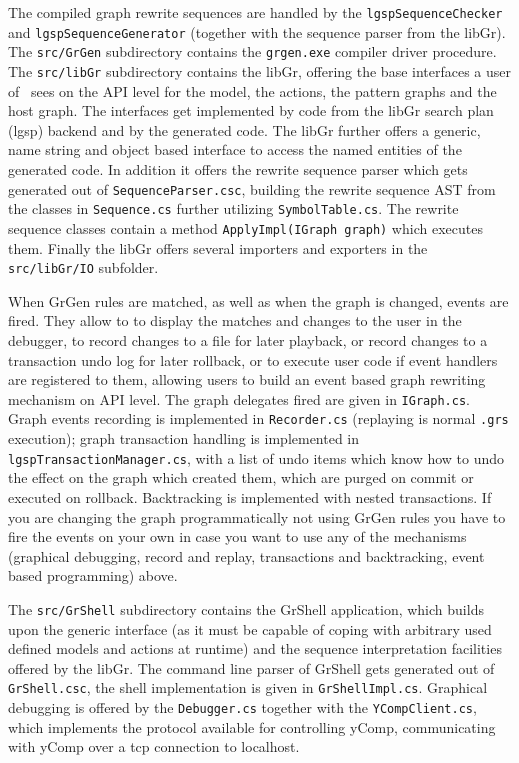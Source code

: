 The compiled graph rewrite sequences are handled by the \texttt{lgsp\-Sequence\-Checker} and \texttt{lgsp\-Sequence\-Generator} (together with the sequence parser from the libGr).
The \texttt{src/GrGen} subdirectory contains the \texttt{grgen.exe} compiler driver procedure.
The \texttt{src/libGr} subdirectory contains the libGr, offering the base interfaces a user of \GrG~sees on the API level for the model, the actions, the pattern graphs and the host graph.
The interfaces get implemented by code from the libGr search plan (lgsp) backend and by the generated code.
The libGr further offers a generic, name string and object based interface to access the named entities of the generated code.
In addition it offers the rewrite sequence parser which gets generated out of \texttt{SequenceParser.csc},
building the rewrite sequence AST from the classes in \texttt{Sequence.cs} further utilizing \texttt{SymbolTable.cs}.
The rewrite sequence classes contain a method \texttt{ApplyImpl(IGraph graph)} which executes them.
Finally the libGr offers several importers and exporters in the \texttt{src/libGr/IO} subfolder.

When GrGen rules are matched, as well as when the graph is changed, events are fired.
They allow to to display the matches and changes to the user in the debugger,
to record changes to a file for later playback, or record changes to a transaction undo log for later rollback, 
or to execute user code if event handlers are registered to them,
allowing users to build an event based graph rewriting mechanism on API level.
The graph delegates fired are given in \texttt{IGraph.cs}.
Graph events recording is implemented in \texttt{Recorder.cs} (replaying is normal \texttt{.grs} execution);
graph transaction handling is implemented in \texttt{lgspTransactionManager.cs}, with a list of undo items which know how to undo the effect on the graph which created them, which are purged on commit or executed on rollback.
Backtracking is implemented with nested transactions.
If you are changing the graph programmatically not using GrGen rules you have to fire the events on your own in case you want to use any of the mechanisms (graphical debugging, record and replay, transactions and backtracking, event based programming) above.

The \texttt{src/GrShell} subdirectory contains the GrShell application, which builds upon the generic interface (as it must be capable of coping with arbitrary used defined models and actions at runtime) and the sequence interpretation facilities offered by the libGr.
The command line parser of GrShell gets generated out of \texttt{GrShell.csc}, the shell implementation is given in \texttt{GrShellImpl.cs}.
Graphical debugging is offered by the \texttt{Debugger.cs} together with the \texttt{YCompClient.cs}, which implements the protocol available for controlling yComp, communicating with yComp over a tcp connection to localhost.

